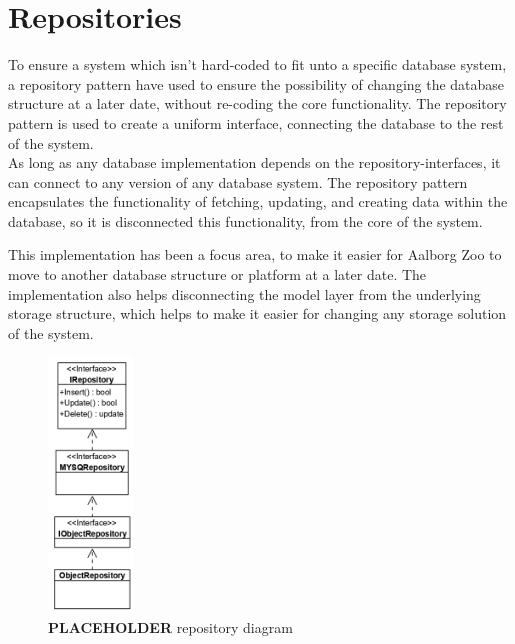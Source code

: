 \section{Repositories}
To ensure a system which isn't hard-coded to fit unto a specific database system, a repository pattern\cite{RepositoryPattern} have used to ensure the possibility of changing the database structure at a later date, without re-coding the core functionality. The repository pattern is used to create a uniform interface, connecting the database to the rest of the system.\\ 
As long as any database implementation depends on the repository-interfaces, it can connect to any version of any database system.
The repository pattern encapsulates the functionality of fetching, updating, and creating data within the database, so it is disconnected this functionality, from the core of the system. \par
This implementation has been a focus area, to make it easier for Aalborg Zoo to move to another database structure or platform at a later date. The implementation also helps disconnecting the model layer from the underlying storage structure, which helps to make it easier for changing any storage solution of the system. \par

\begin{figure}[H]
    \centering
    \includegraphics[width=0.2\textwidth]{figures/GenericRepositoryStructure.PNG}
    \caption{\textbf{PLACEHOLDER} repository diagram}
    \label{fig:RepositoryDiagram}
\end{figure}

